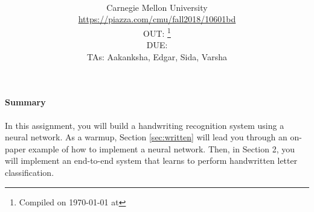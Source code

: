\documentclass[11pt]{article}
\title{\textsc{\hwName}} %
\author{\courseName\\
  Carnegie Mellon University \\
\url{https://piazza.com/cmu/fall2018/10601bd} \\
OUT: \outDate{}\thanks{Compiled on \today{} at \currenttime{}} \\
DUE: \dueDate{} \\ 
TAs: Aakanksha, Edgar, Sida, Varsha}
\date{}
\date{}
\numberwithin{equation}{section} %
\numberwithin{figure}{section} %
\numberwithin{table}{section} %
\begin{document}
\maketitle

\begin{notebox}
\paragraph{Summary} In this assignment, you will build a handwriting recognition system using a neural network. As a warmup, Section \ref{sec:written} will lead you through an on-paper example of how to implement a neural network. Then, in Section 2, you will implement an end-to-end system that learns to perform handwritten letter classification.
\end{notebox}
\end{document}
